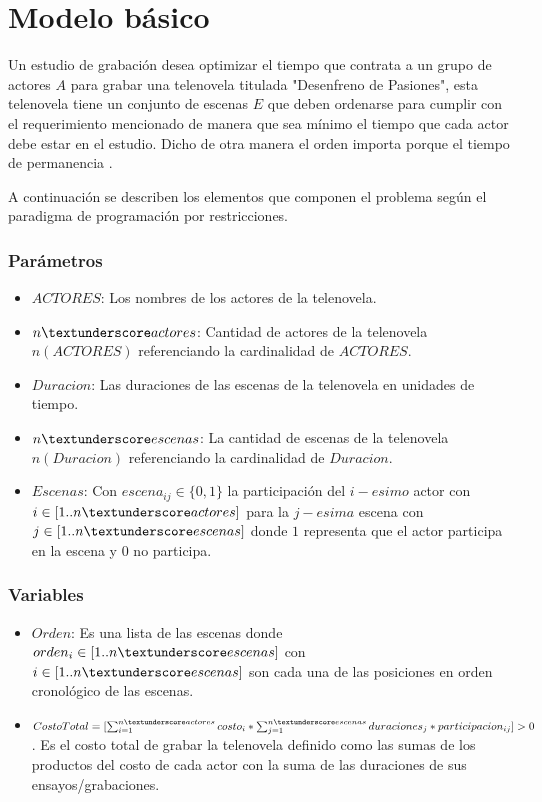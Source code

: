 \documentclass{article}
\begin{document}

\section{Modelo básico}
Un estudio de grabación desea optimizar el tiempo que contrata a un grupo de actores $A$ para grabar una telenovela titulada "Desenfreno de Pasiones", esta telenovela tiene un conjunto de escenas $E$ que deben ordenarse para cumplir con el requerimiento mencionado de manera que sea mínimo el tiempo que cada actor debe estar en el estudio. Dicho de otra manera el orden importa porque el tiempo de permanencia . \newline

A continuación se describen los elementos que componen el problema según el paradigma de programación por restricciones.

\subsubsection{Parámetros}
\begin{itemize}
    \item $ACTORES$: Los nombres de los actores de la telenovela.
    \item $n\textunderscore actores$: Cantidad de actores de la telenovela $n(ACTORES)$ referenciando la cardinalidad de $ACTORES$.
    \item $Duracion$: Las duraciones de las escenas de la telenovela en unidades de tiempo.
    \item $n\textunderscore escenas$: La cantidad de escenas de la telenovela $n(Duracion)$ referenciando la cardinalidad de $Duracion$.
    \item $Escenas$: Con $escena_{ij} \in \{0,1\}$ la participación del $i-esimo$ actor con $i \in [1..n\textunderscore actores]$ para la $j-esima$ escena con $j \in [1..n\textunderscore escenas]$ donde $1$ representa que el actor participa en la escena y $0$ no participa.    
\end{itemize}

\subsubsection{Variables}
\begin{itemize}
    \item $Orden$: Es una lista de las escenas donde $orden_i \in [1..n\textunderscore escenas]$ con $i \in [1..n\textunderscore escenas]$ son cada una de las posiciones en orden cronológico de las escenas.
    \item $CostoTotal = [\sum_{i=1}^{n\textunderscore actores} costo_i * \sum_{j=1}^{n\textunderscore escenas}duraciones_j * participacion_{ij} ]   > 0$. \newline\newline
          Es el costo total de grabar la telenovela definido como las sumas de los productos del costo de cada actor con la suma de las duraciones de sus ensayos/grabaciones.
\end{itemize}
\end{document}
